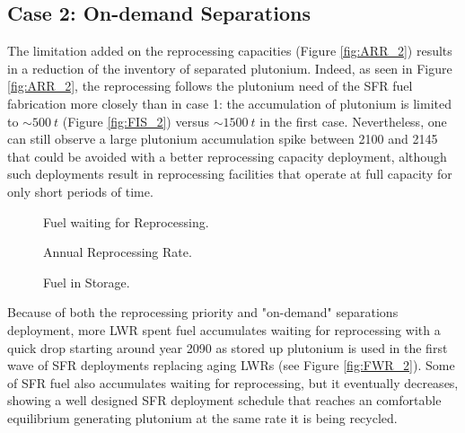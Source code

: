 \documentclass[12pt]{article}
\begin{document}
\subsection{Case 2: On-demand Separations}

The limitation added on the reprocessing capacities (Figure \ref{fig:ARR_2})
results in a reduction of the inventory of separated plutonium. Indeed, as seen in Figure
\ref{fig:ARR_2}, the reprocessing follows the
plutonium need of the SFR fuel fabrication more closely than in case 1: the accumulation of plutonium is
limited to $\sim500~t$ (Figure \ref{fig:FIS_2}) versus $\sim1500~t$ in the first
case. Nevertheless, one can still observe a large plutonium accumulation spike
between 2100 and 2145 that could be avoided with a better reprocessing capacity
deployment, although such deployments result in reprocessing facilities that
operate at full capacity for only short periods of time.

\begin{figure}[h!]
    \centering
    \caption{Fuel waiting for Reprocessing.\label{fig:ARR_FWR_SFC} }
\end{figure}
\begin{figure}[h!]
    \centering
    \caption{Annual Reprocessing Rate.\label{fig:ARR_FWR_SFC_2} }
\end{figure}
\begin{figure}[h!]
    \centering
    \caption{Fuel in Storage.\label{fig:ARR_FWR_SFC_2} }
\end{figure}

Because of both the reprocessing priority and "on-demand" separations
deployment, more LWR spent fuel accumulates waiting for reprocessing with a
quick drop starting around year 2090 as stored up plutonium is used in the first
wave of SFR deployments replacing aging LWRs (see Figure \ref{fig:FWR_2}). Some
of SFR fuel also accumulates waiting for reprocessing, but it eventually
decreases, showing a well designed SFR deployment schedule that reaches an
comfortable equilibrium generating plutonium at the same rate it is being
recycled.
\end{document}
